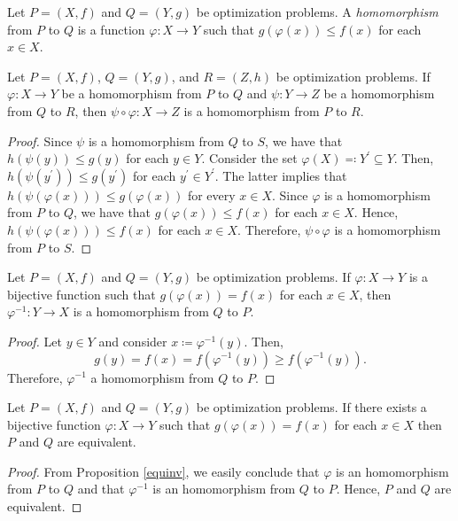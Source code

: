 \documentclass[a4paper]{article}
\begin{document}
\begin{definition}
Let $P=(X,f)$ and $Q=(Y,g)$ be optimization problems. A \emph{homomorphism} from $P$ to $Q$ is a function $\varphi\colon X\to Y$ such that $g(\varphi(x))\leq f(x)$ for each $x\in X$.
\end{definition}

\begin{lemma}\label{optitrans}
Let $P=(X,f)$, $Q=(Y,g)$, and $R=(Z,h)$ be optimization problems. If $\varphi\colon X\to Y$ be a homomorphism from $P$ to $Q$ and $\psi\colon Y\to Z$ be a homomorphism from $Q$ to $R$, then $\psi\circ\varphi\colon X\to Z$ is a homomorphism from $P$ to $R$. 
\end{lemma}
\begin{proof}
 Since $\psi$ is a homomorphism from $Q$ to $S$, we have that $h(\psi(y))\leq
 g(y)$ for each $y\in Y$. Consider the set $\varphi(X)\eqqcolon Y^\prime\subseteq Y$. Then, $h(\psi(y^\prime))\leq g(y^\prime)$ for each $y^\prime\in Y^\prime$. The latter implies that $h(\psi(\varphi(x)))\leq g(\varphi(x))$ for every $x\in X$. Since $\varphi$ is a homomorphism from $P$ to $Q$, we have that $g(\varphi(x))\leq f(x)$ for each $x\in X$. Hence, $h(\psi(\varphi(x)))\leq f(x)$ for each $x\in X$. Therefore, $\psi\circ\varphi$ is a homomorphism from $P$ to $S$.
\end{proof}
\begin{lemma}\label{equinv}
Let $P=(X,f)$ and $Q=(Y,g)$ be optimization problems. If $\varphi\colon X\to Y$ is a bijective function such that $g(\varphi(x))=f(x)$ for each $x\in X$, then $\varphi^{-1}\colon Y\to X$ is a homomorphism from $Q$ to $P$.
\end{lemma}
\begin{proof}
Let $y\in Y$ and consider $x\coloneqq\varphi^{-1}(y)$. Then,
$$g(y)=f(x)=f(\varphi^{-1}(y))\geq f(\varphi^{-1}(y)).$$
Therefore, $\varphi^{-1}$ a homomorphism from $Q$ to $P$.
\end{proof}
\begin{corollary}\label{id}
Let $P=(X,f)$ and $Q=(Y,g)$ be optimization problems. If there exists  a bijective function $\varphi\colon X\to Y$ such that $g(\varphi(x))=f(x)$ for each $x\in X$ then $P$ and $Q$ are equivalent.
\end{corollary}
\begin{proof}
 From Proposition \ref{equinv}, we easily conclude that \(\varphi\) is an
 homomorphism from \(P\) to \(Q\) and that \(\varphi^{-1}\) is an homomorphism
 from \(Q\) to \(P\). Hence, \(P\) and \(Q\) are equivalent.
\end{proof}
\end{document}
